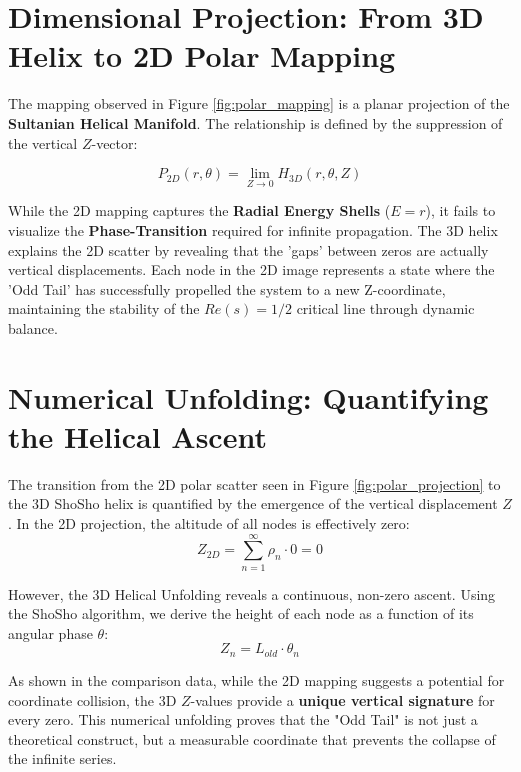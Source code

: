 \documentclass[11pt,a4paper]{article}
\begin{document}
\section{Dimensional Projection: From 3D Helix to 2D Polar Mapping}

The mapping observed in Figure \ref{fig:polar_mapping} is a planar projection of the \textbf{Sultanian Helical Manifold}. The relationship is defined by the suppression of the vertical $Z$-vector:

\begin{equation}
    P_{2D}(r, \theta) = \lim_{Z \to 0} H_{3D}(r, \theta, Z)
\end{equation}

While the 2D mapping captures the \textbf{Radial Energy Shells} ($E = r$), it fails to visualize the \textbf{Phase-Transition} required for infinite propagation. The 3D helix explains the 2D scatter by revealing that the 'gaps' between zeros are actually vertical displacements. Each node in the 2D image represents a state where the 'Odd Tail' has successfully propelled the system to a new Z-coordinate, maintaining the stability of the $Re(s)=1/2$ critical line through dynamic balance.

\section{Numerical Unfolding: Quantifying the Helical Ascent}

The transition from the 2D polar scatter seen in Figure \ref{fig:polar_projection} to the 3D ShoSho helix is quantified by the emergence of the vertical displacement $Z$. In the 2D projection, the altitude of all nodes is effectively zero:
\begin{equation}
    Z_{2D} = \sum_{n=1}^{\infty} \rho_n \cdot 0 = 0
\end{equation}

However, the 3D Helical Unfolding reveals a continuous, non-zero ascent. Using the ShoSho algorithm, we derive the height of each node as a function of its angular phase $\theta$:
\begin{equation}
    Z_n = L_{old} \cdot \theta_n
\end{equation}

As shown in the comparison data, while the 2D mapping suggests a potential for coordinate collision, the 3D $Z$-values provide a \textbf{unique vertical signature} for every zero. This numerical unfolding proves that the "Odd Tail" is not just a theoretical construct, but a measurable coordinate that prevents the collapse of the infinite series.
\end{document}
